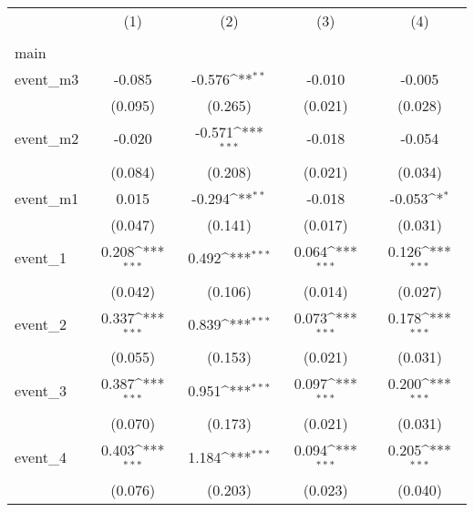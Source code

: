 {
\def\sym#1{\ifmmode^{#1}\else\(^{#1}\)\fi}
\begin{tabular}{l*{4}{c}}
\hline\hline
                    &\multicolumn{1}{c}{(1)}&\multicolumn{1}{c}{(2)}&\multicolumn{1}{c}{(3)}&\multicolumn{1}{c}{(4)}\\
                    &\multicolumn{1}{c}{} &\multicolumn{1}{c}{} &\multicolumn{1}{c}{} &\multicolumn{1}{c}{} \\
\hline
main                &                     &                     &                     &                     \\
event\_m3            &      -0.085         &      -0.576\sym{**} &      -0.010         &      -0.005         \\
                    &     (0.095)         &     (0.265)         &     (0.021)         &     (0.028)         \\
[1em]
event\_m2            &      -0.020         &      -0.571\sym{***}&      -0.018         &      -0.054         \\
                    &     (0.084)         &     (0.208)         &     (0.021)         &     (0.034)         \\
[1em]
event\_m1            &       0.015         &      -0.294\sym{**} &      -0.018         &      -0.053\sym{*}  \\
                    &     (0.047)         &     (0.141)         &     (0.017)         &     (0.031)         \\
[1em]
event\_1             &       0.208\sym{***}&       0.492\sym{***}&       0.064\sym{***}&       0.126\sym{***}\\
                    &     (0.042)         &     (0.106)         &     (0.014)         &     (0.027)         \\
[1em]
event\_2             &       0.337\sym{***}&       0.839\sym{***}&       0.073\sym{***}&       0.178\sym{***}\\
                    &     (0.055)         &     (0.153)         &     (0.021)         &     (0.031)         \\
[1em]
event\_3             &       0.387\sym{***}&       0.951\sym{***}&       0.097\sym{***}&       0.200\sym{***}\\
                    &     (0.070)         &     (0.173)         &     (0.021)         &     (0.031)         \\
[1em]
event\_4             &       0.403\sym{***}&       1.184\sym{***}&       0.094\sym{***}&       0.205\sym{***}\\
                    &     (0.076)         &     (0.203)         &     (0.023)         &     (0.040)         \\

\end{tabular}}
